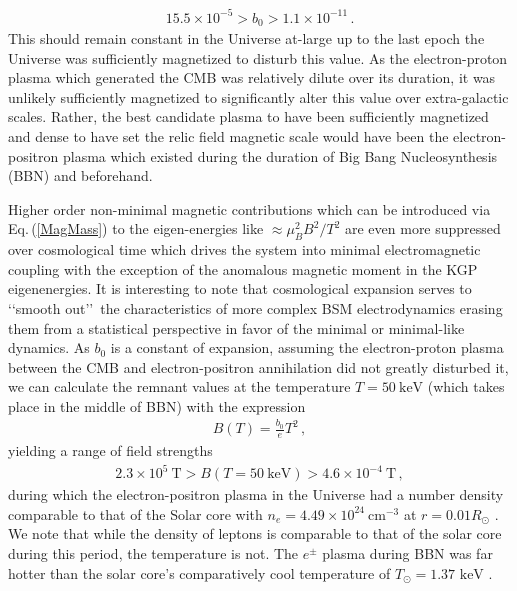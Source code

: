 \documentclass[universe,article,submit,moreauthors,pdftex,a4paper]{Definitions/mdpi}
\newcommand{\keV}{\text{ keV}}
\newcommand{\req}[1]{Eq.\,(\ref{#1})}
\begin{document}
\begin{alignat}{1}
    \label{BoScale} 5.5\times10^{-5}>b_{0}>1.1\times10^{-11}\,.
\end{alignat}
This should remain constant in the Universe at-large up to the last epoch the Universe was sufficiently magnetized to disturb this value. As the electron-proton plasma which generated the CMB was relatively dilute over its duration, it was unlikely sufficiently magnetized to significantly alter this value over extra-galactic scales. Rather, the best candidate plasma to have been sufficiently magnetized and dense to have set the relic field magnetic scale would have been the electron-positron plasma which existed during the duration of Big Bang Nucleosynthesis (BBN) and beforehand.

Higher order non-minimal magnetic contributions which can be introduced via \req{MagMass} to the eigen-energies like $\approx\mu_{B}^{2}B^{2}/T^{2}$ are even more suppressed over cosmological time which drives the system into minimal electromagnetic coupling with the exception of the anomalous magnetic moment in the KGP eigenenergies. It is interesting to note that cosmological expansion serves to \lq\lq smooth out\rq\rq\ the characteristics of more complex BSM electrodynamics erasing them from a statistical perspective in favor of the minimal or minimal-like dynamics. As $b_0$ is a constant of expansion, assuming the electron-proton plasma between the CMB and electron-positron annihilation did not greatly disturbed it, we can calculate the remnant values at the temperature $T=50\ \mathrm{keV}$ (which takes place in the middle of BBN) with the expression
\begin{align}
  \label{BBNFields} B(T)=\frac{b_{0}}{e}T^{2}\,,
\end{align}
yielding a range of field strengths
\begin{align}
  \label{BBNRange} 2.3\times10^{5}\ \mathrm{T}>B(T=50\ \mathrm{keV})>4.6\times10^{-4}\ \mathrm{T}\,,
\end{align}
during which the electron-positron plasma in the Universe had a number density comparable to that of the Solar core with $n_{e}=4.49\times10^{24}\ \mathrm{cm}^{-3}$ at $r=0.01R_{\odot}$ \cite{Bahcall:2000nu}. We note that while the density of leptons is comparable to that of the solar core during this period, the temperature is not. The $e^{\pm}$ plasma during BBN was far hotter than the solar core's comparatively cool temperature of $T_{\odot}=1.37\keV$ \cite{Castellani:1996cm}.

\end{document}
